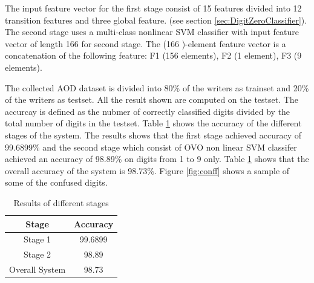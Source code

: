 \documentclass[10pt]{IEEEtran}
\begin{document}
     The input feature vector for the first stage consist of 15 features divided into 12 transition features and three global feature. (see section \ref{sec:DigitZeroClassifier}). The second stage uses a multi-class nonlinear SVM classifier with input feature vector of length 166 for second stage. The (166 )-element feature vector is a concatenation of the following feature: F1 (156 elements), F2 (1 element), F3 (9 elements).

     The collected AOD dataset is divided into 80\% of the writers as trainset and 20\% of the writers as testset. All the result shown are computed on the testset. The accurcay is defined as the nubmer of correctly classified digits divided by the total number of digits in the testset.  Table \ref{tab:ResultsStage1} shows the accuracy of the different stages of the system. The results shows that the first stage achieved accuracy of 99.6899\%  and the second stage which consist of OVO non linear SVM classifer achieved an accuracy of  98.89\%  on digits from 1 to 9 only. Table \ref{tab:ResultsStage1} shows that the overall accuracy of the  system is 98.73\%.  Figure \ref{fig:conff} shows a sample of some of the confused digits.  %


\begin{table}[h]
\begin{center}
\caption[First Stage result table]{ Results of different stages }
 \begin{tabular}{|c|c|}
 \hline
Stage &   Accuracy   \\ \hline
	Stage 1  &  99.6899   \\ \hline
    Stage 2  & 98.89 \\ \hline
	Overall System  &  98.73  \\   \hline

\end{tabular}
\label{tab:ResultsStage1}
\end{center}
\end{table}
\end{document}
